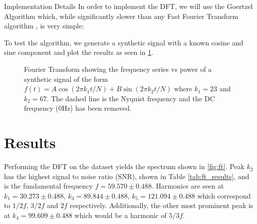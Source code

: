 \documentclass[reqno]{amsart}
\makeatletter
\renewcommand\subsection{\@startsection{subsection}{2}%
  \z@{.5\linespacing\@plus.7\linespacing}{-.5em}%
  {\normalfont\scshape\justify}}
\numberwithin{equation}{section}
\numberwithin{figure}{section}
\makeatother
\begin{document}
\subsection{Implementation Details}
In order to implement the DFT, we will use the Goertzel Algorithm \cite{Goertzel1958} which, while significantly slower than any Fast Fourier Transform algorithm \cite{Cooley1965}, is very simple: \\

To test the algorithm, we generate a synthetic signal with a known cosine and sine component and plot the results as seen in \ref{fig:ft_synthetic}. 
\begin{figure}[ht]
    \centering
    
    \caption{Fourier Transform showing the frequency series vs power of a synthetic signal of the form $f(t) = A\cos(2\pi k_1 t / N) + B\sin(2\pi k_2 t / N)$ where $k_1 = 23$ and $k_2 = 67$. The dashed line is the Nyquist frequency and the DC frequency (0Hz) has been removed.}
    \label{fig:ft_synthetic}
\end{figure}

\section{Results}
Performing the DFT on the dataset yields the spectrum shown in \ref{fig:ft}. Peak $k_2$ has the highest signal to noise ratio (SNR), shown in Table \ref{tab:ft_results}, and is the fundamental frequency $f = 59.570 \pm 0.488$. Harmonics are seen at $k_1 = 30.273 \pm 0.488$, $k_3 = 89.844 \pm 0.488$, $k_5 = 121.094 \pm 0.488$ which correspond to $1/2f$, $3/2f$ and $2f$ respectively. Additionally, the other most prominent peak is at $k_4 = 99.609 \pm 0.488$ which would be a harmonic of $5/3f$. \\
\end{document}
